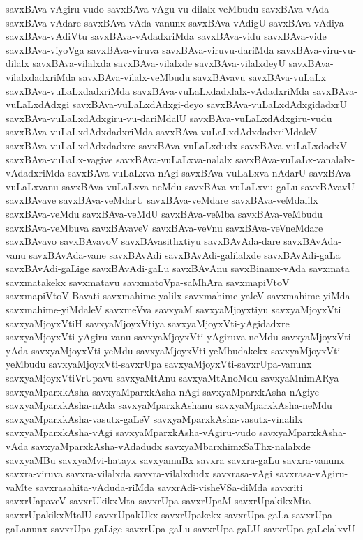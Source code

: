 {savxBAva-vAgiru-vudo
savxBAva-vAgu-vu-dilalx-veMbudu
savxBAva-vAda
savxBAva-vAdare
savxBAva-vAda-vanunx
savxBAva-vAdigU
savxBAva-vAdiya
savxBAva-vAdiVtu
savxBAva-vAdadxriMda
savxBAva-vidu
savxBAva-vide
savxBAva-viyoVga
savxBAva-viruva
savxBAva-viruvu-dariMda
savxBAva-viru-vu-dilalx
savxBAva-vilalxda
savxBAva-vilalxde
savxBAva-vilalxdeyU
savxBAva-vilalxdadxriMda
savxBAva-vilalx-veMbudu
savxBAvavu
savxBAva-vuLaLx
savxBAva-vuLaLxdadxriMda
savxBAva-vuLaLxdadxlalx-vAdadxriMda
savxBAva-vuLaLxdAdxgi
savxBAva-vuLaLxdAdxgi-deyo
savxBAva-vuLaLxdAdxgidadxrU
savxBAva-vuLaLxdAdxgiru-vu-dariMdalU
savxBAva-vuLaLxdAdxgiru-vudu
savxBAva-vuLaLxdAdxdadxriMda
savxBAva-vuLaLxdAdxdadxriMdaleV
savxBAva-vuLaLxdAdxdadxre
savxBAva-vuLaLxdudx
savxBAva-vuLaLxdodxV
savxBAva-vuLaLx-vagive
savxBAva-vuLaLxva-nalalx
savxBAva-vuLaLx-vanalalx-vAdadxriMda
savxBAva-vuLaLxva-nAgi
savxBAva-vuLaLxva-nAdarU
savxBAva-vuLaLxvanu
savxBAva-vuLaLxva-neMdu
savxBAva-vuLaLxvu-gaLu
savxBAvavU
savxBAvave
savxBAva-veMdarU
savxBAva-veMdare
savxBAva-veMdalilx
savxBAva-veMdu
savxBAva-veMdU
savxBAva-veMba
savxBAva-veMbudu
savxBAva-veMbuva
savxBAvaveV
savxBAva-veVnu
savxBAva-veVneMdare
savxBAvavo
savxBAvavoV
savxBAvasithxtiyu
savxBAvAda-dare
savxBAvAda-vanu
savxBAvAda-vane
savxBAvAdi
savxBAvAdi-galilalxde
savxBAvAdi-gaLa
savxBAvAdi-gaLige
savxBAvAdi-gaLu
savxBAvAnu
savxBinanx-vAda
savxmata
savxmatakekx
savxmatavu
savxmatoVpa-saMhAra
savxmapiVtoV
savxmapiVtoV-Bavati
savxmahime-yalilx
savxmahime-yaleV
savxmahime-yiMda
savxmahime-yiMdaleV
savxmeVva
savxyaM
savxyaMjoyxtiyu
savxyaMjoyxVti
savxyaMjoyxVtiH
savxyaMjoyxVtiya
savxyaMjoyxVti-yAgidadxre
savxyaMjoyxVti-yAgiru-vanu
savxyaMjoyxVti-yAgiruva-neMdu
savxyaMjoyxVti-yAda
savxyaMjoyxVti-yeMdu
savxyaMjoyxVti-yeMbudakekx
savxyaMjoyxVti-yeMbudu
savxyaMjoyxVti-savxrUpa
savxyaMjoyxVti-savxrUpa-vanunx
savxyaMjoyxVtiVrUpavu
savxyaMtAnu
savxyaMtAnoMdu
savxyaMnimARya
savxyaMparxkAsha
savxyaMparxkAsha-nAgi
savxyaMparxkAsha-nAgiye
savxyaMparxkAsha-nAda
savxyaMparxkAshanu
savxyaMparxkAsha-neMdu
savxyaMparxkAsha-vasutx-gaLeV
savxyaMparxkAsha-vasutx-vinalilx
savxyaMparxkAsha-vAgi
savxyaMparxkAsha-vAgiru-vudo
savxyaMparxkAsha-vAda
savxyaMparxkAsha-vAdadudx
savxyaMbarxhimxSaThx-nalalxde
savxyaMBu
savxyaMvi-hatayx
savxyamuBx
savxra
savxra-gaLu
savxra-vanunx
savxra-viruva
savxra-vilalxda
savxra-vilalxdudx
savxrasa-vAgi
savxrasa-vAgiru-vaMte
savxrasahita-vAduda-riMda
savxrAdi-visheVSa-diMda
savxriti
savxrUapaveV
savxrUkikxMta
savxrUpa
savxrUpaM
savxrUpakikxMta
savxrUpakikxMtalU
savxrUpakUkx
savxrUpakekx
savxrUpa-gaLa
savxrUpa-gaLanunx
savxrUpa-gaLige
savxrUpa-gaLu
savxrUpa-gaLU
savxrUpa-gaLelalxvU
}
